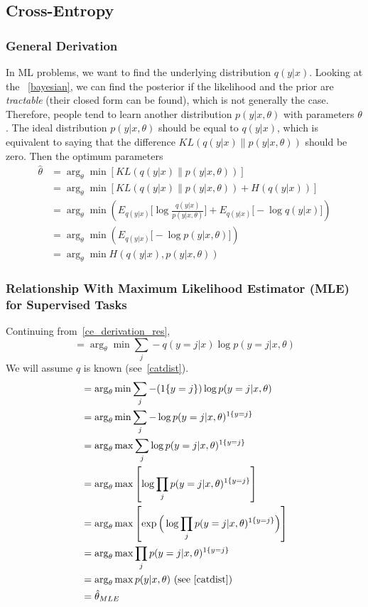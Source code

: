 \documentclass{article}
\numberwithin{equation}{subsection}
\begin{document}
\subsection{Cross-Entropy}
\subsubsection{General Derivation}
\label{ce_derivation}
In ML problems, we want to find the underlying distribution $q(y|x)$. Looking at the ~\ref{bayesian}, we can find the posterior if the likelihood and the prior are \textit{tractable} (their closed form can be found), which is not generally the case. Therefore, people tend to learn another distribution $p(y|x,\theta)$ with parameters $\theta$. The ideal distribution $p(y|x,\theta)$ should be equal to $q(y|x)$, which is equivalent to saying that the difference $KL(q(y|x)\parallel p(y|x,\theta))$ should be zero. Then the optimum parameters
\begin{align}
    \hat{\theta} 
    &= \arg_\theta \min[KL(q(y|x) \parallel p(y|x,\theta))]\\
    &= \arg_\theta \min[ KL(q(y|x) \parallel p(y|x,\theta)) + H(q(y|x))]\\
    &= \arg_\theta \min \left( E_{q(y|x)}\Big[\log\frac{q(y|x)}{p(y|x,\theta)}\Big] + E_{q(y|x)}\Big[-\log q(y|x)\Big]\right)\\
    &= \arg_\theta \min \left( E_{q(y|x)}\Big[-\log p(y|x,\theta)\Big]\right)\label{ce_derivation_res}\\
    &= \arg_\theta \min H(q(y|x), p(y|x,\theta))
\end{align}
\subsubsection{Relationship With Maximum Likelihood Estimator (MLE) for Supervised Tasks}
\label{mle_ce}
Continuing from~\ref{ce_derivation_res}, 
\begin{equation}
    = \arg_\theta \min \sum_j -q(y=j|x)\log p(y=j|x,\theta)
\end{equation}
We will assume $q$ is known (see~\ref{catdist}).
\begin{align}
    &= \arg_\theta \min \sum_j -(1\{y=j\})\log p(y=j|x,\theta)\\
    &= \arg_\theta \min \sum_j -\log p(y=j|x,\theta)^{1\{y=j\}}\\
    &= \arg_\theta \max \sum_j \log p(y=j|x,\theta)^{1\{y=j\}}\\
    &= \arg_\theta \max\left[\log\prod_j p(y=j|x,\theta)^{1\{y=j\}}\right]\\
    &= \arg_\theta \max\left[\exp\Big(\log\prod_j p(y=j|x,\theta)^{1\{y=j\}}\Big)\right]\\
    &= \arg_\theta \max\prod_j p(y=j|x,\theta)^{1\{y=j\}}\\
    &= \arg_\theta\max p(y|x,\theta) \ \text{(see~\ref{catdist})}\\
    &= \hat{\theta}_{MLE}\label{mle_ce_res}
\end{align}
\end{document}
